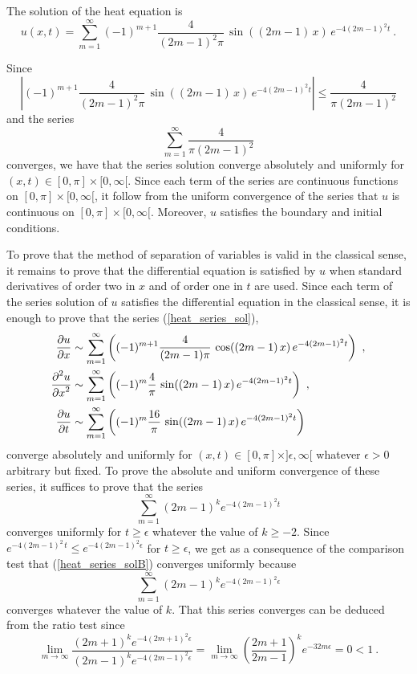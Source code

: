 \begin{egg}
The solution of the heat equation is
\begin{equation} \label{heat_series_sol}
u(x,t) = \sum_{m=1}^\infty (-1)^{m+1}\frac{4}{(2m-1)^2 \pi}\,
\sin((2m-1)\,x)\, e^{-4(2m-1)^2t} \ .
\end{equation}

Since
\[
\left| (-1)^{m+1}\frac{4}{(2m-1)^2 \pi}\, \sin((2m-1)\,x)\, e^{-4(2m-1)^2t}
\right| \leq \frac{4}{\pi(2m-1)^2}
\]
and the series
\[
\sum_{m=1}^\infty \frac{4}{\pi(2m-1)^2}
\]
converges, we have that the series solution converge absolutely and
uniformly for $(x,t) \in [0,\pi] \times [0,\infty[$.  Since each term
of the series are continuous functions on $[0,\pi] \times [0,\infty[$,
it follow from the uniform convergence of the series that $u$ is
continuous on $[0,\pi] \times [0,\infty[$.  Moreover, $u$
satisfies the boundary and initial conditions.

To prove that the method of separation of variables is valid in the
classical sense, it remains to prove that the differential equation is
satisfied by $u$ when standard derivatives of order two in $x$ and of
order one in $t$ are used.  Since each term of the series solution of
$u$ satisfies the differential equation in the classical sense, it is
enough to prove that the series (\ref{heat_series_sol}),
\begin{equation} \label{heat_spv_der_series}
\begin{split}
\frac{\partial{u}}{\partial x} &\sim \sum_{m=1}^\infty  \left( (-1)^{m+1}\frac{4}{(2m-1) \pi}\,
\cos((2m-1)\,x)\, e^{-4(2m-1)^2t} \right) \ , \\
\frac{\displaystyle \partial^{2}{u}} {\displaystyle \partial x^{2}} &\sim \sum_{m=1}^\infty \left( (-1)^m\frac{4}{\pi}\,
\sin((2m-1)\,x)\, e^{-4(2m-1)^2t} \right) \ , \\
\frac{\partial{u}}{\partial t} &\sim \sum_{m=1}^\infty \left( (-1)^m\frac{16}{\pi}\,
\sin((2m-1)\,x)\, e^{-4(2m-1)^2t} \right)
\end{split}
\end{equation}
converge absolutely and uniformly for
$(x,t)\in [0,\pi]\times ]\epsilon,\infty[$
whatever $\epsilon>0$ arbitrary but fixed.  To prove the absolute and uniform
convergence of these series, it suffices to prove that the series
\begin{equation}\label{heat_series_solB}
\sum_{m=1}^\infty (2m-1)^{k} e^{-4(2m-1)^2 t}
\end{equation}
converges uniformly for $t\geq \epsilon$ whatever the value of
$k\geq -2$.  Since
$\displaystyle e^{-4(2m-1)^2\,t} \leq e^{-4(2m-1)^2\epsilon}$
for $t\geq \epsilon$,  we get as a consequence of the comparison test that
(\ref{heat_series_solB}) converges uniformly because
\[
\sum_{m=1}^\infty (2m-1)^{k} e^{-4(2m-1)^2\epsilon}
\]
converges whatever the value of $k$.  That this series converges can
be deduced from the ratio test since
\[
\lim_{m\rightarrow \infty}
\frac{ \displaystyle (2m+1)^{k} e^{-4(2m+1)^2\epsilon}}
{ \displaystyle (2m-1)^{k} e^{-4(2m-1)^2\epsilon}}
= \lim_{m\rightarrow \infty} \left(\frac{2m+1}{2m-1}\right)^{k}
e^{-32 m \epsilon} = 0 < 1 \  .
\]
\end{egg}

